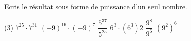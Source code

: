 %
%
Ecris le résultat sous forme de puissance d'un seul nombre.
	\begin{tasks} (3)
		\task $7^{25}\cdot 7^{31}$
		\task $(-9)^{16}\cdot (-9)^7$
		\task $\dfrac{5^{37}}{5^{25}}$
		\task $6^3\cdot (6^3)2$
		\task $\dfrac{9^8}{9^6}$
		\task $(9^2)^6$
	\end{tasks}
